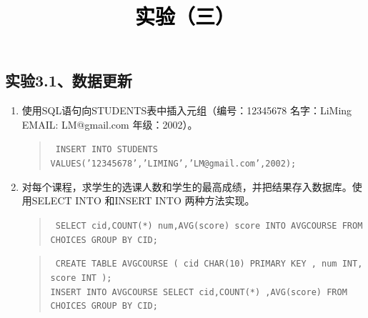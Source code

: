 \documentclass[a4paper,twoside]{article}
\newcommand{\PaperTitle}{实验（三）}  %
\begin{document}
\newpage

\title{
	\Large{\textcolor{black}{\PaperTitle}}
}
	
	
\maketitle
	
\tableofcontents
 
\newpage
\setcounter{page}{1}

\begin{spacing}{1.2}

\section{实验3.1、数据更新}

\begin{enumerate}
  \item	使用SQL语句向STUDENTS表中插入元组（编号：12345678  名字：LiMing EMAIL: LM@gmail.com  年级：2002）。
  
  \begin{quote}
    \texttt{
      INSERT INTO STUDENTS VALUES('12345678','LIMING','LM@gmail.com',2002);\\
    } 
  \end{quote}
  
  \item	对每个课程，求学生的选课人数和学生的最高成绩，并把结果存入数据库。使用SELECT INTO 和INSERT INTO 两种方法实现。
 \begin{quote}
    \texttt{
      SELECT cid,COUNT(*) num,AVG(score) score
INTO AVGCOURSE
FROM CHOICES
GROUP BY CID;\\
    }
  \end{quote}

  \begin{quote}
    \texttt{
      CREATE TABLE AVGCOURSE
(
cid CHAR(10) PRIMARY KEY ,
num INT,
score INT
);\\
INSERT INTO AVGCOURSE
SELECT cid,COUNT(*) ,AVG(score)
FROM CHOICES
GROUP BY CID;\\
    }
  \end{quote}


\end{enumerate}
\end{spacing}
\end{document}
